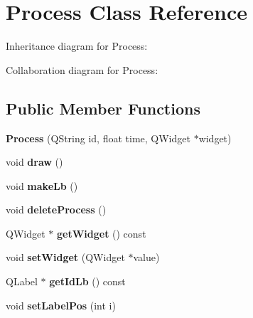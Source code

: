 \hypertarget{classProcess}{}\section{Process Class Reference}
\label{classProcess}


Inheritance diagram for Process\+:


Collaboration diagram for Process\+:
\subsection*{Public Member Functions}
\begin{DoxyCompactItemize}
\item 
\mbox{\label{classProcess_a9f8678e2ce417082256d95b4d521f81d}} 
{\bfseries Process} (Q\+String id, float time, Q\+Widget $\ast$widget)
\item 
\mbox{\label{classProcess_a3a3d91657ede8930580507814d503904}} 
void {\bfseries draw} ()
\item 
\mbox{\label{classProcess_ac0db14a4fd82966e71a72316a3c38b5f}} 
void {\bfseries make\+Lb} ()
\item 
\mbox{\label{classProcess_a099201c343c615f08d0761abce53ecde}} 
void {\bfseries delete\+Process} ()
\item 
\mbox{\label{classProcess_a5e8ffc1993643928b5d5a457c2db8df4}} 
Q\+Widget $\ast$ {\bfseries get\+Widget} () const
\item 
\mbox{\label{classProcess_ab7d7d633341f8b5c5a1d29958133428a}} 
void {\bfseries set\+Widget} (Q\+Widget $\ast$value)
\item 
\mbox{\label{classProcess_a2e8d251cba4446c577612cdd7206469f}} 
Q\+Label $\ast$ {\bfseries get\+Id\+Lb} () const
\item 
\mbox{\label{classProcess_a79df6728469ce9a2130ddce6a95bb968}} 
void {\bfseries set\+Label\+Pos} (int i)
\end{DoxyCompactItemize}
